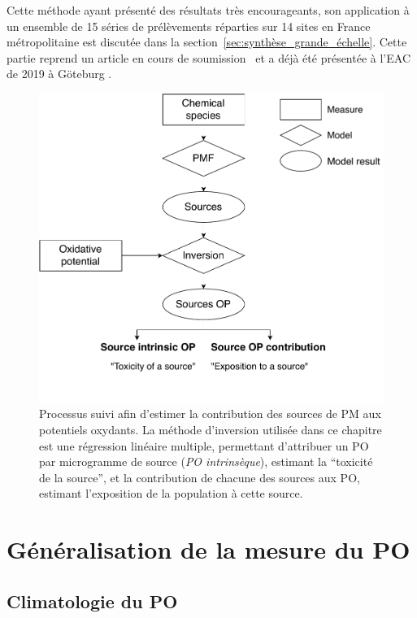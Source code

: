 Cette méthode ayant présenté des résultats très encourageants, son application à un
ensemble de 15 séries de prélèvements réparties sur 14 sites en France métropolitaine est
discutée dans la section~\ref{sec:synthèse_grande_échelle}.
Cette partie reprend un article en cours de soumission~\autocite{weberSourceinprep.} et a
déjà été présentée à l'EAC de 2019 à Göteburg \autocite{weberSources2019}.

\begin{figure}[ht]
    \centering
    \includegraphics[width=0.8\linewidth]{figures/chapter04/flowchart_inversion.pdf}
    \caption{Processus suivi afin d'estimer la contribution des sources de PM aux
        potentiels oxydants. La méthode d'inversion utilisée dans ce chapitre est une
        régression linéaire multiple, permettant d'attribuer un PO par microgramme de source
        (\textit{PO intrinsèque}), estimant la ``toxicité de la source'', et la contribution de
    chacune des sources aux PO, estimant l'exposition de la population à cette source.}%
    \label{fig:workflow_inversion}
\end{figure}


\section{Généralisation de la mesure du PO}%
\label{sec:généralisation_de_mesure_du_po}

\subsection{Climatologie du PO}%
\label{sub:climatologie_du_po}

